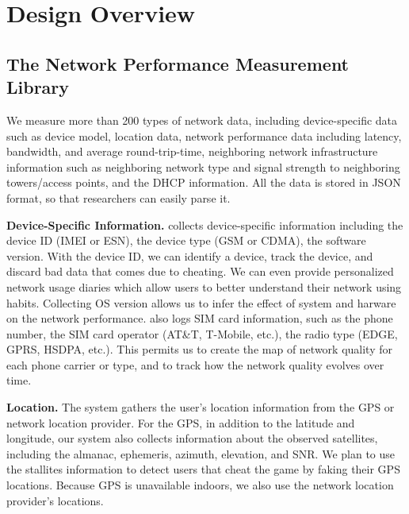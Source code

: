 \section{Design Overview}
\label{s:overview}

\subsection{The Network Performance Measurement Library}
We measure more than 200 types of network data, including device-specific data such as device model, 
location data, network performance data including latency, bandwidth, and average round-trip-time, 
neighboring network infrastructure information such as neighboring network type and signal strength to 
neighboring towers/access points, and the DHCP information. All the data is stored in JSON format, so
that researchers can easily parse it.


{\bfseries Device-Specific Information.} \name{} collects device-specific information including the device ID 
(IMEI or ESN), the device type (GSM or CDMA), the software version. With the device ID, we can 
identify a device, track the device, and discard bad data that comes due to cheating. We can 
even provide personalized network usage diaries which allow users to better understand their network 
using habits.
Collecting OS version allows us to infer the effect of system and harware on the network performance. \name{} also 
logs SIM card information, such as the phone number, the SIM card operator (AT\&T, T-Mobile, etc.),
the radio type (EDGE, GPRS, HSDPA, etc.).
This permits us to create the map of network quality for each phone carrier or type, and to track how the network quality 
evolves over time.

{\bfseries Location.} The system gathers the user's location information from the GPS or network location provider. 
For the GPS, in addition to the latitude and longitude, our system also collects information 
about the observed satellites, including the almanac, ephemeris, azimuth, elevation, and SNR.
We plan to use the stallites information to detect users that cheat the game by faking their GPS locations.
Because GPS is unavailable indoors, we also use the network location provider's locations.


